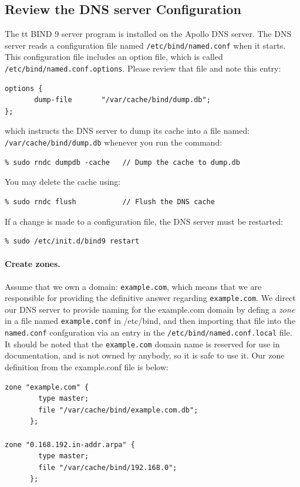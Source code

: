 \subsection{Review the DNS server Configuration} 

The {tt BIND 9} server program is installed on the Apollo DNS server\cite{bib3}.
The DNS server reads a configuration file named
{\tt /etc/bind/named.conf} when it starts. This configuration file includes an option 
file, which is called {\tt /etc/bind/named.conf.options}.  Please 
review that file and note this entry:
\begin{verbatim}
options {
       dump-file       "/var/cache/bind/dump.db";
};
\end{verbatim}

\noindent which instructs the DNS server to dump its cache into
a file named: \texttt{/var/cache/bind/dump.db} 
whenever you run the command:
\begin{verbatim}
% sudo rndc dumpdb -cache 	// Dump the cache to dump.db  
\end{verbatim}
\noindent You may delete the cache using:
\begin{verbatim}
% sudo rndc flush         	// Flush the DNS cache
\end{verbatim}


If a change is made to a configuration file, the DNS server must be
restarted:
\begin{verbatim}
% sudo /etc/init.d/bind9 restart
\end{verbatim}


\paragraph{Create zones.}
Assume that we own a domain: {\tt example.com}, which means that we are 
responsible for providing the
definitive answer regarding {\tt example.com}. We direct our DNS server
to provide naming for the example.com domain by defing a \textit{zone}
in a file named {\tt example.conf} in /etc/bind, and then importing
that file into the {\tt named.conf} confguration via an entry in 
the {\tt /etc/bind/named.conf.local} file.
It should be noted that the {\tt example.com}
domain name is reserved for use in documentation, and is not owned
by anybody, so it is safe to use it.
Our zone definition from the example.conf file is below:
\begin{verbatim}
zone "example.com" {
        type master;
        file "/var/cache/bind/example.com.db";
      };

zone "0.168.192.in-addr.arpa" {
        type master;
        file "/var/cache/bind/192.168.0";
      };
\end{verbatim}

